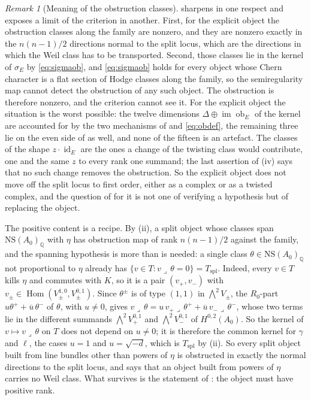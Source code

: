 \documentclass[11pt,reqno]{amsart}
\theoremstyle{plain}
\theoremstyle{definition}
\theoremstyle{remark}
\newtheorem{remark}[theorem]{Remark}
\newcommand{\QQ}{\mathbb{Q}}
\newcommand{\NS}{\mathrm{NS}}
\DeclareMathOperator{\Hom}{Hom}
\DeclareMathOperator{\image}{im}
\DeclareMathOperator{\id}{id}
\DeclareMathOperator{\ob}{ob}
\newcommand{\bbar}[1]{\overline{#1}}
\begin{document}
\begin{remark}[Meaning of the obstruction classes]\label{rem:obstructionmeaning}
 sharpens \cite[Remark~9.21]{paperI} in one
respect and exposes a limit of the criterion in another. First, for the
explicit object the obstruction classes along the family are nonzero, and
they are nonzero exactly in the $n(n-1)/2$ directions normal to the split
locus, which are the directions in which the Weil class has to be
transported. Second, those classes lie in the kernel of $\sigma_{E}$ by
\eqref{eq:sigmaob}, and \eqref{eq:sigmaob} holds for every object whose
Chern character is a flat section of Hodge classes along the family, so the
semiregularity map cannot detect the obstruction of any such object. The
obstruction is therefore nonzero, and the criterion cannot see it. For
the explicit object the
situation is the worst possible: the twelve dimensions
$\Delta\oplus\image\ob_{E}$ of the kernel are accounted for by the two
mechanisms of \cite[Corollary~9.18]{paperI} and \eqref{eq:obdef}, the remaining
three lie on the even side of \cite[Corollary~9.8]{paperI} as well, and none of
the fifteen is an artefact. The classes of the shape $z\cdot\id_{E}$ are the
ones a change of the twisting class would contribute, one and the same $z$
to every rank one summand; the last assertion of (iv) says that no such
change removes the obstruction. So the explicit object does not move off the
split locus to first order, either as a complex or as a twisted complex, and
the question of \cite[Question~15.13]{paperI} for it is not one of verifying a
hypothesis but of replacing the object.

The positive content is a recipe. By (ii), a split object whose classes
span $\NS(A_{0})_{\QQ}$ with $\eta$ has obstruction map of rank
$n(n-1)/2$ against the family, and the spanning hypothesis is more than is
needed: a single class $\theta\in\NS(A_{0})_{\QQ}$ not proportional to
$\eta$ already has $\{v\in T:v\lrcorner\,\theta=0\}=T_{\mathrm{spl}}$.
Indeed, every $v\in T$ kills $\eta$ and commutes with $K$, so it is a pair
$(v_{+},v_{-})$ with $v_{\pm}\in\Hom(V_{\pm}^{1,0},V_{\pm}^{0,1})$. Since
$\theta^{\pm}$ is of type $(1,1)$ in $\bigwedge^{2}V_{\pm}$, the $R_{0}$-part
$u\theta^{+}+\bbar u\,\theta^{-}$ of $\theta$, with $u\ne0$, gives
$v\lrcorner\,\theta=u\,v_{+}\lrcorner\,\theta^{+}+\bbar u\,v_{-}\lrcorner\,\theta^{-}$,
whose two terms lie in the different summands $\bigwedge^{2}V_{+}^{0,1}$ and
$\bigwedge^{2}V_{-}^{0,1}$ of $H^{0,2}(A_{0})$. So the kernel of
$v\mapsto v\lrcorner\,\theta$ on $T$ does not depend on $u\ne0$; it is
therefore the common kernel for $\gamma$ and $\ell$, the cases $u=1$ and
$u=\sqrt{-d}$, which is $T_{\mathrm{spl}}$ by (ii). So every split object built from line bundles
other than powers of $\eta$ is obstructed in exactly the normal directions
to the split locus, and  says that an object built
from powers of $\eta$ carries no Weil class. What survives is the statement
of \cite[Remark~9.9]{paperI}: the object must have positive rank.
\end{remark}
\end{document}
